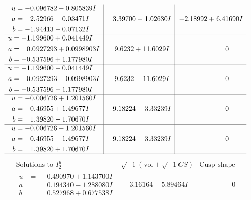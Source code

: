 \documentclass[1p]{elsarticle_modified}
\theoremstyle{definition}
\newcommand{\I}{\sqrt{-1}}
\begin{document}
$$\begin{array}{c|c|c}
\begin{aligned}
u &= -0.096782 - 0.805839 I \\
a &= \phantom{-}2.52966 - 0.03471 I \\
b &= -1.94413 - 0.07132 I\end{aligned}
 & \phantom{-}3.39700 - 1.02630 I & -2.18992 + 6.41690 I \\ \hline\begin{aligned}
u &= -1.199600 + 0.041449 I \\
a &= \phantom{-}0.0927293 + 0.0998903 I \\
b &= -0.537596 + 1.177980 I\end{aligned}
 & \phantom{-}9.6232 + 11.6029 I & \phantom{-0.000000 } 0 \\ \hline\begin{aligned}
u &= -1.199600 - 0.041449 I \\
a &= \phantom{-}0.0927293 - 0.0998903 I \\
b &= -0.537596 - 1.177980 I\end{aligned}
 & \phantom{-}9.6232 - 11.6029 I & \phantom{-0.000000 } 0 \\ \hline\begin{aligned}
u &= -0.006726 + 1.201560 I \\
a &= -0.46955 + 1.49677 I \\
b &= \phantom{-}1.39820 - 1.70670 I\end{aligned}
 & \phantom{-}9.18224 - 3.33239 I & \phantom{-0.000000 } 0 \\ \hline\begin{aligned}
u &= -0.006726 - 1.201560 I \\
a &= -0.46955 - 1.49677 I \\
b &= \phantom{-}1.39820 + 1.70670 I\end{aligned}
 & \phantom{-}9.18224 + 3.33239 I & \phantom{-0.000000 } 0\\
 \hline 
 \end{array}$$\newpage$$\begin{array}{c|c|c}  
\text{Solutions to }I^u_{2}& \I (\text{vol} + \sqrt{-1}CS) & \text{Cusp shape}\\
 \hline 
\begin{aligned}
u &= \phantom{-}0.490970 + 1.143700 I \\
a &= \phantom{-}0.194340 - 1.288080 I \\
b &= \phantom{-}0.527968 + 0.677538 I\end{aligned}
 & \phantom{-}3.16164 - 5.89464 I & \phantom{-0.000000 } 0 \\ \hline\begin{aligned}

\end{aligned}
\end{array}$$
\end{document}
